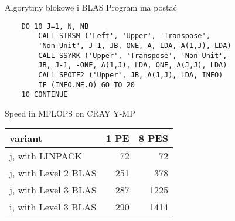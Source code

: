 	\begin{frame}[fragile]{Algorytmy blokowe i BLAS}
	Program ma postać
		\begin{lstlisting}
    DO 10 J=1, N, NB
        CALL STRSM ('Left', 'Upper', 'Transpose', 
        'Non-Unit', J-1, JB, ONE, A, LDA, A(1,J), LDA)
        CALL SSYRK ('Upper', 'Transpose', 'Non-Unit', 
        JB, J-1, -ONE, A(1,J), LDA, ONE, A(J,J), LDA)
        CALL SPOTF2 ('Upper', JB, A(J,J), LDA, INFO)
        IF (INFO.NE.O) GO TO 20
    10 CONTINUE
		\end{lstlisting}
	\end{frame}
	\begin{frame}{Speed in MFLOPS on CRAY Y-MP}
		\begin{center}
    			\begin{tabular}{| l | r | r |}
   				 \hline
				 variant & 1 PE & 8 PES \\
				 \hline
				 j, with LINPACK & 72 & 72 \\
				 j, with Level 2 BLAS & 251 & 378 \\
				 j, with Level 3 BLAS & 287 & 1225 \\
				 i, with Level 3 BLAS & 290 & 1414 \\
				 \hline
			\end{tabular}
		\end{center}
	\end{frame}
	

	